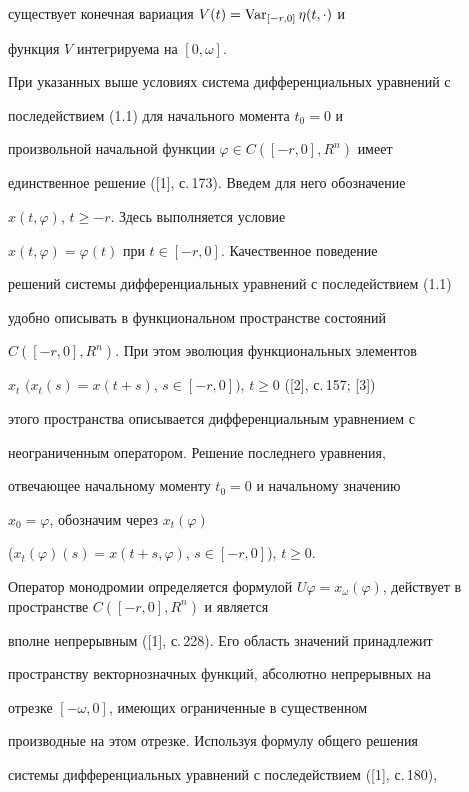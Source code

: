 существует конечная вариация $V(t)=\operatorname{Var}_{[-r,0]} \eta(t,\cdot)$ и


функция $V$ интегрируема на $[0,\omega].$





При указанных выше условиях система дифференциальных уравнений с


последействием (1.1) для начального момента $t_{0} =0$ и


произвольной начальной функции $\varphi\in C([-r,0],R^{n})$ имеет


единственное решение ([1], с.\,173). Введем для него обозначение


$x(t,\varphi)$, $t\geq-r$. Здесь выполняется условие


$x(t,\varphi)=\varphi(t)$ при $t\in[-r,0]$. Качественное поведение


решений системы дифференциальных уравнений с последействием (1.1)


удобно описывать в функциональном пространстве состояний


$C([-r,0],R^{n})$. При этом эволюция функциональных элементов


$x_{t}$ $(x_{t}(s)=x(t+s)$, $s\in[-r,0])$, $t\geq0$ ([2], с.\,157; [3])


этого пространства описывается дифференциальным уравнением с


неограниченным оператором. Решение последнего уравнения,


отвечающее начальному моменту $t_{0}=0$ и начальному значению


$x_{0}=\varphi$, обозначим через $x_{t}(\varphi)$


($x_{t}(\varphi)(s)=x(t+s,\varphi)$, $s\in[-r,0]$), $t\geq0$.





Оператор монодромии определяется формулой $U\varphi=x_{\omega}


(\varphi)$, действует в пространстве $C([-r,0],R^{n} )$ и является


вполне непрерывным ([1], с.\,228). Его область значений принадлежит


пространству векторнозначных функций, абсолютно непрерывных на


отрезке $[- \omega, 0]$, имеющих ограниченные в существенном


производные на этом отрезке. Используя формулу общего решения


системы дифференциальных уравнений с последействием ([1], с.\,180),


